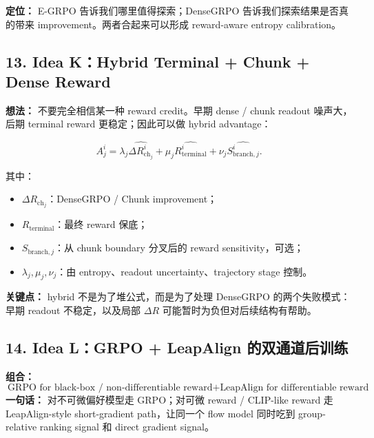 \begin{summarybox}
\textbf{定位：} E-GRPO 告诉我们哪里值得探索；DenseGRPO 告诉我们探索结果是否真的带来 improvement。两者合起来可以形成 reward-aware entropy calibration。
\end{summarybox}

\subsection{13. Idea K：Hybrid Terminal + Chunk + Dense Reward}

\textbf{想法：} 不要完全相信某一种 reward credit。早期 dense / chunk readout 噪声大，后期 terminal reward 更稳定；因此可以做 hybrid advantage：

\[
A^i_{j}
=
\lambda_j\widehat{\Delta R^i_{\mathrm{ch}_j}}
+
\mu_j\widehat{R^i_{\mathrm{terminal}}}
+
\nu_j\widehat{S^i_{\mathrm{branch},j}}.
\]

其中：

\begin{itemize}[leftmargin=1.5em]
  \item \(\Delta R_{\mathrm{ch}_j}\)：DenseGRPO / Chunk improvement；
  \item \(R_{\mathrm{terminal}}\)：最终 reward 保底；
  \item \(S_{\mathrm{branch},j}\)：从 chunk boundary 分叉后的 reward sensitivity，可选；
  \item \(\lambda_j,\mu_j,\nu_j\)：由 entropy、readout uncertainty、trajectory stage 控制。
\end{itemize}

\begin{warnbox}
\textbf{关键点：} hybrid 不是为了堆公式，而是为了处理 DenseGRPO 的两个失败模式：早期 readout 不稳定，以及局部 \(\Delta R\) 可能暂时为负但对后续结构有帮助。
\end{warnbox}

\subsection{14. Idea L：GRPO + LeapAlign 的双通道后训练}

\begin{conceptbox}
\textbf{组合：}
\[
\text{GRPO for black-box / non-differentiable reward}
+ \text{LeapAlign for differentiable reward}
\]
\textbf{一句话：} 对不可微偏好模型走 GRPO；对可微 reward / CLIP-like reward 走 LeapAlign-style short-gradient path，让同一个 flow model 同时吃到 group-relative ranking signal 和 direct gradient signal。
\end{conceptbox}

